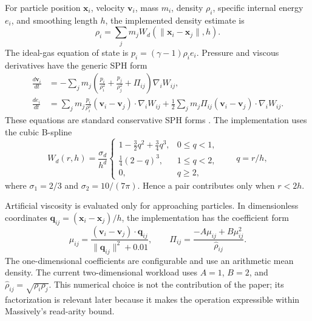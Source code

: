 \documentclass[a4paper,10pt]{article}
\begin{document}
For particle position $\mathbf{x}_i$, velocity $\mathbf{v}_i$, mass $m_i$,
density $\rho_i$, specific internal energy $e_i$, and smoothing length $h$, the
implemented density estimate is
\begin{equation}
  \rho_i = \sum_j m_j W_d(\lVert\mathbf{x}_i-\mathbf{x}_j\rVert,h).
  \label{eq:density}
\end{equation}
The ideal-gas equation of state is $p_i=(\gamma-1)\rho_i e_i$.  Pressure and
viscous derivatives have the generic SPH form
\begin{align}
  \frac{d\mathbf{v}_i}{dt}
    &= -\sum_j m_j\left(\frac{p_i}{\rho_i^2}
                       +\frac{p_j}{\rho_j^2}+\Pi_{ij}\right)
       \nabla_i W_{ij}, \\
  \frac{de_i}{dt}
    &= \sum_j m_j\frac{p_i}{\rho_i^2}
       (\mathbf{v}_i-\mathbf{v}_j)\mathbin{\cdot}\nabla_iW_{ij}
       +\frac12\sum_jm_j\Pi_{ij}
       (\mathbf{v}_i-\mathbf{v}_j)\mathbin{\cdot}\nabla_iW_{ij}.
  \label{eq:derivatives}
\end{align}
These equations are standard conservative SPH forms
\citep{monaghan2005,price2012}.  The implementation uses the cubic B-spline
\begin{equation}
 W_d(r,h)=\frac{\sigma_d}{h^d}
 \begin{cases}
  1-\tfrac32q^2+\tfrac34q^3,&0\le q<1,\\
  \tfrac14(2-q)^3,&1\le q<2,\\
  0,&q\ge2,
 \end{cases}
 \qquad q=r/h,
 \label{eq:kernel}
\end{equation}
where $\sigma_1=2/3$ and $\sigma_2=10/(7\pi)$.  Hence a pair contributes only
when $r<2h$.

Artificial viscosity is evaluated only for approaching particles.  In
dimensionless coordinates $\mathbf{q}_{ij}=(\mathbf{x}_i-\mathbf{x}_j)/h$, the
implementation has the coefficient form
\begin{equation}
 \mu_{ij}=\frac{(\mathbf{v}_i-\mathbf{v}_j)\cdot\mathbf{q}_{ij}}
                 {\lVert\mathbf{q}_{ij}\rVert^2+0.01},\qquad
 \Pi_{ij}=\frac{-A\mu_{ij}+B\mu_{ij}^2}{\widehat\rho_{ij}}.
 \label{eq:viscosity}
\end{equation}
The one-dimensional coefficients are configurable and use an arithmetic mean
density.  The current two-dimensional workload uses $A=1$, $B=2$, and
$\widehat\rho_{ij}=\sqrt{\rho_i\rho_j}$.  This numerical choice is not the
contribution of the paper; its factorization is relevant later because it makes
the operation expressible within Massively's read-arity bound.
\end{document}
